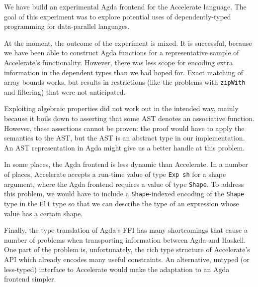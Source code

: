 \documentclass{llncs}
\begin{document}
We have build an experimental Agda frontend for the Accelerate
language. The goal of this experiment was to explore potential uses of
dependently-typed programming for data-parallel languages. 

At the moment, the outcome of the experiment is mixed. It is
successful, because we have been able to construct Agda functions for
a representative sample of Accelerate's functionality.
However, there was less scope for encoding extra information in the
dependent types than we had hoped for. Exact matching of array bounds
works, but results in restrictions (like the problems with
\texttt{zipWith} and filtering) that were not anticipated.

Exploiting algebraic properties did not work out in the intended way, mainly
because it boils down to asserting that some AST denotes an
associative function. However, these assertions cannot be proven: the
proof would have to apply the semantics to the AST, but the AST is an
abstract type in our implementation. An AST representation in Agda
might give us a better handle at this problem. 

In some places, the Agda frontend is less dynamic than Accelerate. In
a number of places, Accelerate accepts a run-time value of type
\texttt{Exp sh} for a shape argument, where the Agda frontend requires
a value of type \texttt{Shape}. To address this problem, we would have
to include a \texttt{Shape}-indexed encoding of the \texttt{Shape}
type in the \texttt{Elt} type so that we can describe the type of
an expression whose value has a certain shape. 

Finally, the type translation of Agda's FFI has many shortcomings that
cause a number of problems when transporting information between Agda
and Haskell. One part of the problem is, unfortunately, the rich type
structure of Accelerate's API which already encodes many useful
constraints. An alternative, untyped (or less-typed) interface to
Accelerate would make the adaptation to an Agda frontend simpler.

%
%


\end{document}
